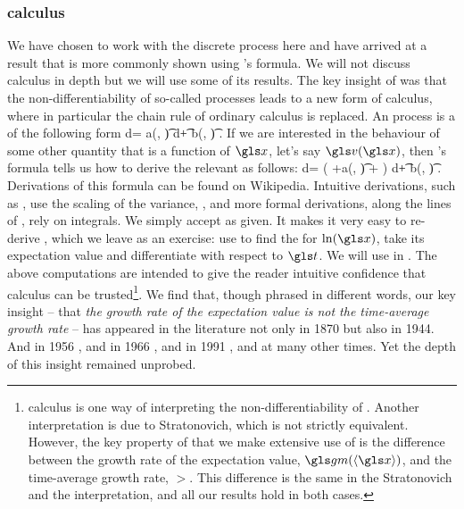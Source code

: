 \subsubsection{\Ito calculus}
We have chosen to work with the discrete process here and have arrived at a result that is more
commonly shown using \Ito's formula. We will not discuss \Ito calculus in depth 
but we will use some of its results. The key insight of \Ito was that the non-differentiability
of so-called \Ito processes leads to a new form of calculus, where in particular the chain rule of
ordinary calculus is replaced.
An \Ito process is a \SDE of the following form
\be
d\x = a(\x, \t) d\t + b(\x, \t) \gd\gW.
\ee
If we are interested in the behaviour of some other quantity that is a 
function of $\x$, let's say $\gv(\x)$, then \Ito's formula tells us how to derive
the relevant \SDE as follows:
\be
d\gv =  \left(\frac{\partial \gv}{\partial\t} +a(\x, \t)\frac{\partial \gv}{\partial\x} +  \right) d\t + b(\x, \t) \frac{\partial \gv}{\partial\x} \gd\gW.
\ee
Derivations of this formula can be found on Wikipedia. Intuitive derivations, such as \cite{Hull2006}, use the 
scaling of the variance, , and more formal 
derivations, along the lines of \cite{Harrison2013}, rely on integrals.
We simply accept  as given. It makes it very easy to re-derive , which we leave as an exercise:
use  to find the \SDE for $\ln(\x)$, take its expectation value and differentiate with respect to $\t$. 
We will use  in . The above computations are intended to 
give the reader intuitive confidence that \Ito calculus can be 
trusted\footnote{\Ito calculus is one way of interpreting the non-differentiability of \gd\gW. Another interpretation
is due to Stratonovich, which is not strictly equivalent. However, the key property of \GBM that we make
extensive use of is the difference between the growth rate of the expectation value, $\gm(\ave{\x})$, and the
time-average growth rate, $\gt$. This difference is the same in the Stratonovich and the \Ito interpretation, and all our results hold in both cases.}. 
We find that, though phrased in different words, our key insight -- that {\it the growth rate of the expectation value is not the time-average
growth rate} -- has appeared in the literature not only in 1870 but also in 1944.
And in 1956 \cite{Kelly1956}, and in 1966 \cite{Thorp1966}, and in 1991 \cite{CoverThomas1991}, and at many other times. 
Yet the depth of this insight remained unprobed.


